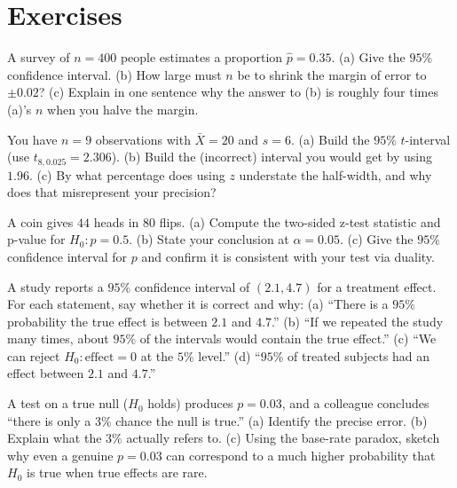 \section{Exercises}
\label{ch32:exercises}

\begin{exercise}
A survey of $n=400$ people estimates a proportion $\hat p = 0.35$. (a) Give the $95\%$
confidence interval. (b) How large must $n$ be to shrink the margin of error to $\pm
0.02$? (c) Explain in one sentence why the answer to (b) is roughly four times (a)'s $n$
when you halve the margin.
\end{exercise}

\begin{exercise}[z versus t]
You have $n=9$ observations with $\bar X = 20$ and $s = 6$. (a) Build the $95\%$
$t$-interval (use $t_{8,0.025}=2.306$). (b) Build the (incorrect) interval you would get
by using $1.96$. (c) By what percentage does using $z$ understate the half-width, and
why does that misrepresent your precision?
\end{exercise}

\begin{exercise}
A coin gives $44$ heads in $80$ flips. (a) Compute the two-sided z-test statistic and
p-value for $H_0\!: p=0.5$. (b) State your conclusion at $\alpha=0.05$. (c) Give the
$95\%$ confidence interval for $p$ and confirm it is consistent with your test via
duality.
\end{exercise}

\begin{exercise}
A study reports a $95\%$ confidence interval of $(2.1, 4.7)$ for a treatment effect. For
each statement, say whether it is correct and why: (a) ``There is a $95\%$ probability
the true effect is between $2.1$ and $4.7$.'' (b) ``If we repeated the study many times,
about $95\%$ of the intervals would contain the true effect.'' (c) ``We can reject
$H_0\!:\text{effect}=0$ at the $5\%$ level.'' (d) ``$95\%$ of treated subjects had an
effect between $2.1$ and $4.7$.''
\end{exercise}

\begin{exercise}
A test on a true null ($H_0$ holds) produces $p=0.03$, and a colleague concludes ``there
is only a $3\%$ chance the null is true.'' (a) Identify the precise error. (b) Explain
what the $3\%$ actually refers to. (c) Using the base-rate paradox, sketch why even a
genuine $p=0.03$ can correspond to a much higher probability that $H_0$ is true when
true effects are rare.
\end{exercise}

